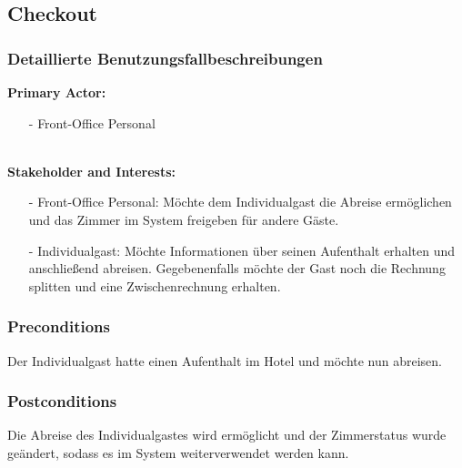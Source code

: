 \documentclass[./detailed_overview_usecases.tex]{subfiles}
\begin{document}
    \subsection{Checkout}
    \subsubsection{Detaillierte Benutzungsfallbeschreibungen}
    \textbf{Primary Actor: }
    \begin{itemize}
        \item [-] Front-Office Personal
    \end{itemize}
    \\
    \textbf{Stakeholder and Interests:}
    \begin{itemize}
        \item[-] Front-Office Personal: Möchte dem Individualgast die Abreise ermöglichen und das Zimmer im System freigeben für andere Gäste.
        \item[-] Individualgast: Möchte Informationen über seinen Aufenthalt erhalten und anschließend abreisen. Gegebenenfalls
        möchte der Gast noch die Rechnung splitten und eine Zwischenrechnung erhalten.
    \end{itemize}

    \subsubsection*{Preconditions}
    Der Individualgast hatte einen Aufenthalt im Hotel und möchte nun abreisen.

    \subsubsection*{Postconditions}
    Die Abreise des Individualgastes wird ermöglicht und der Zimmerstatus wurde geändert,
    sodass es im System weiterverwendet werden kann.
\end{document}
